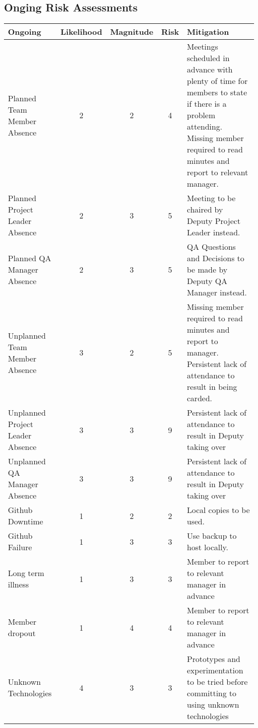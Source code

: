 \newcommand\rot{rotatebox{90}}

\subsection{Onging Risk Assessments}
	\begin{tabular}[]{| p{5cm} | c | c | c | p{10cm} |}
		\hline
		\textbf{Ongoing} & \textbf{Likelihood} & \textbf{Magnitude} & \textbf{Risk} & \textbf{Mitigation} \\ \hline \hline%
		Planned Team Member Absence  & 2 & 2 & 4 & Meetings scheduled in advance with plenty of time for members to state if there is a problem attending. Missing member required to read minutes and report to relevant manager. \\ \hline
		Planned Project Leader Absence & 2 & 3 & 5 & Meeting to be chaired by Deputy Project Leader instead. \\ \hline
		Planned QA Manager Absence & 2 & 3 & 5 & QA Questions and Decisions to be made by Deputy QA Manager instead. \\ \hline
		Unplanned Team Member Absence  & 3 & 2 & 5 & Missing member required to read minutes and report to manager. Persistent lack of attendance to result in being carded. \\ \hline
		Unplanned Project Leader Absence & 3 & 3 & 9 & Persistent lack of attendance to result in Deputy taking over\\ \hline
		Unplanned QA Manager Absence & 3 & 3 & 9 & Persistent lack of attendance to result in Deputy taking over\\ \hline
		Github Downtime & 1 & 2 & 2 & Local copies to be used. \\ \hline
		Github Failure & 1 & 3 & 3 & Use backup to host locally. \\ \hline
		Long term illness & 1 & 3 & 3 & Member to report to relevant manager in advance\\ \hline
		Member dropout & 1 & 4 & 4 & Member to report to relevant manager in advance\\ \hline
		Unknown Technologies & 4 & 3 & 3 & Prototypes and experimentation to be tried before committing to using unknown technologies\\ \hline
	\end{tabular} \\

